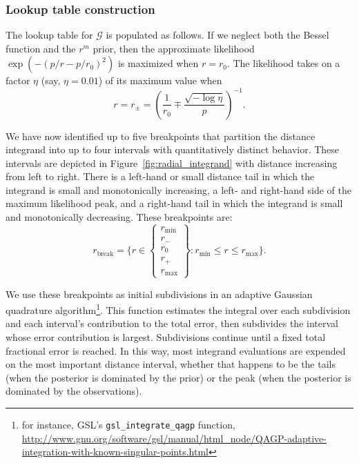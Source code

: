 \documentclass[amsmath,amssymb,aps,prx,reprint,nopreprintnumbers,nofootinbib,showpacs]{revtex4-1}
\begin{document}
\subsubsection{Lookup table construction}

The lookup table for $\mathscr{G}$ is populated as follows. If we neglect both the Bessel function and the $r^m$ prior, then the approximate likelihood $\exp(-(p/r-p/r_0)^2)$ is maximized when $r = r_0$. The likelihood takes on a factor $\eta$ (say, $\eta=0.01$) of its maximum value when
%
\begin{equation}
    r = r_\pm = \left(\frac{1}{r_0} \mp \frac{\sqrt{-\log\eta}}{p}\right)^{-1}.
\end{equation}

We have now identified up to five breakpoints that partition the distance integrand into up to four intervals with quantitatively distinct behavior. These intervals are depicted in Figure~\ref{fig:radial_integrand} with distance increasing from left to right. There is a left\nobreakdashes-hand or small distance tail in which the integrand is small and monotonically increasing, a left\nobreakdashes- and right\nobreakdashes-hand side of the maximum likelihood peak, and a right\nobreakdashes-hand tail in which the integrand is small and monotonically decreasing. These breakpoints are:
%
\begin{equation}
    r_\mathrm{break} = \{ r \in
    \left\{
    \begin{array}{c}
    r_\mathrm{min} \\
    r_- \\
    r_0 \\
    r_+ \\
    r_\mathrm{max}
    \end{array}
    \right\} :
    r_\mathrm{min} \leq r
    \leq r_\mathrm{max}\}.
\end{equation}

We use these breakpoints as initial subdivisions in an adaptive Gaussian quadrature algorithm\footnote{for instance, \ac{GSL}'s \texttt{gsl\_integrate\_qagp} function, \url{http://www.gnu.org/software/gsl/manual/html_node/QAGP-adaptive-integration-with-known-singular-points.html}}. This function estimates the integral over each subdivision and each interval's contribution to the total error, then subdivides the interval whose error contribution is largest. Subdivisions continue until a fixed total fractional error is reached. In this way, most integrand evaluations are expended on the most important distance interval, whether that happens to be the tails (when the posterior is dominated by the prior) or the peak (when the posterior is dominated by the observations).
\end{document}
